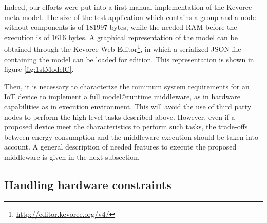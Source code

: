 Indeed, our efforts were put into a first manual implementation of the Kevoree meta-model.
The size of the test application which contains a group and a node without components is of 181997 bytes, while the needed RAM before the execution is of 1616 bytes. %
A graphical representation of the model can be obtained through the Kevoree Web Editor\footnote{\url{http://editor.kevoree.org/v4/}}, in which a serialized JSON file containing the model can be loaded for edition.
This representation is shown in figure \ref{fig:1stModelC}.


Then, it is necessary to characterize the minimum system requirements for an IoT device to implement a full model@runtime middleware, as in hardware capabilities as in execution environment.
This will avoid the use of third party nodes to perform the high level tasks described above.
However, even if a proposed device meet the characteristics to perform such tasks, the trade-offs between energy consumption and the middleware execution should be taken into account.
A general description of needed features to execute the proposed middleware is given in the next subsection.

\subsection{Handling hardware constraints}

